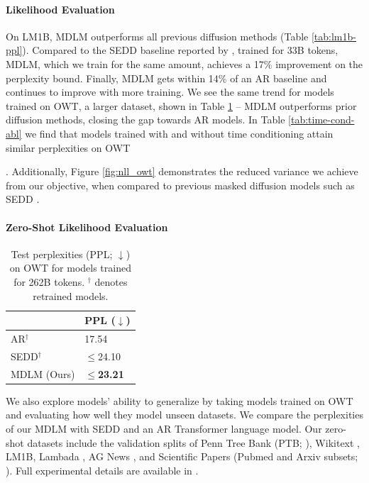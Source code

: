 \documentclass{article} %
\def\algo{MDLM}
\def\owt{OWT}
\begin{document}
\paragraph{Likelihood Evaluation}
On LM1B, \algo{} outperforms all previous diffusion methods (Table \ref{tab:lm1b-ppl}).
Compared to the SEDD baseline reported by \citet{lou2023discrete}, trained for 33B tokens, \algo{}, which we train for the same amount, achieves a 17\% improvement on the perplexity bound.
Finally, \algo{} gets within 14\% of an AR baseline and continues to improve with more training.
We see the same trend for models trained on OWT, a larger dataset, shown in Table \ref{owt-ppl} -- \algo{} outperforms prior diffusion methods, closing the gap towards AR models.
In Table \ref{tab:time-cond-abl} we find that models trained with and without time conditioning attain similar perplexities on \owt{. Additionally, Figure \ref{fig:nll_owt} demonstrates the reduced variance we achieve from our objective, when compared to previous masked diffusion models such as SEDD \citep{lou2023discrete}.




\paragraph{Zero-Shot Likelihood Evaluation}
\begin{table}
  \vspace{-1em}
  \caption{Test perplexities (PPL; $\downarrow$) on \owt{} for models trained for 262B tokens. $^\dagger$ denotes retrained models.}
  \label{owt-ppl}
  \centering
  \begin{tabular}{ll}
    \toprule
    & PPL ($\downarrow$) \\
    \midrule
    AR$^\dagger$ & 17.54 \\
    \midrule
    SEDD$^\dagger$  & $\leq$24.10 \\
    \algo{} (Ours) & $\leq$\bf{23.21} \\
    \bottomrule
  \end{tabular}
  \vspace{-1em}
\end{table}
We also explore models' ability to generalize by taking models trained on OWT and evaluating how well they model unseen datasets.
We compare the perplexities of our \algo{} with SEDD \citep{austin2021structured} and an AR Transformer language model.
Our zero-shot datasets include the validation splits of Penn Tree Bank (PTB; \citep{marcus1993building}), Wikitext \citep{merity2016pointer}, LM1B, Lambada \citep{paperno-EtAl:2016:P16-1}, AG News \citep{Zhang2015CharacterlevelCN}, and Scientific Papers (Pubmed and Arxiv subsets; \citep{Cohan_2018}).
Full experimental details are available in .

}
\end{document}
